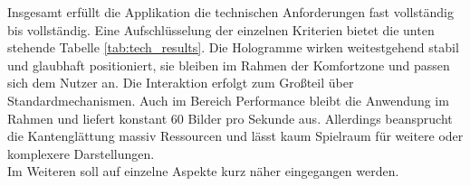 Insgesamt erfüllt die Applikation die technischen Anforderungen fast vollständig bis vollständig. Eine Aufschlüsselung der einzelnen Kriterien bietet die unten stehende Tabelle \ref{tab:tech_results}. Die Hologramme wirken weitestgehend stabil und glaubhaft positioniert, sie bleiben im Rahmen der Komfortzone und passen sich dem Nutzer an. Die Interaktion erfolgt zum Großteil über Standardmechanismen. Auch im Bereich Performance bleibt die Anwendung im Rahmen und liefert konstant 60 Bilder pro Sekunde aus. Allerdings beansprucht die Kantenglättung massiv Ressourcen und lässt kaum Spielraum für weitere oder komplexere Darstellungen.\\

Im Weiteren soll auf einzelne Aspekte kurz näher eingegangen werden.\\
 
